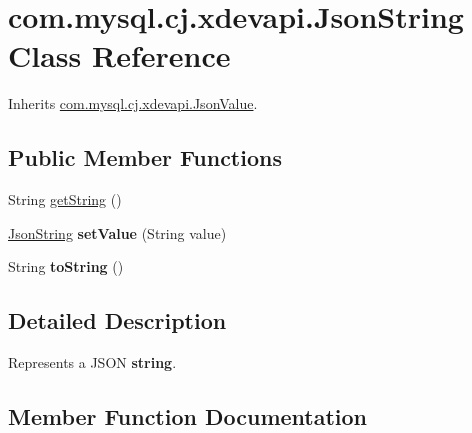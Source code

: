 \hypertarget{classcom_1_1mysql_1_1cj_1_1xdevapi_1_1_json_string}{}\section{com.\+mysql.\+cj.\+xdevapi.\+Json\+String Class Reference}
\label{classcom_1_1mysql_1_1cj_1_1xdevapi_1_1_json_string}


Inherits \mbox{\hyperlink{interfacecom_1_1mysql_1_1cj_1_1xdevapi_1_1_json_value}{com.\+mysql.\+cj.\+xdevapi.\+Json\+Value}}.

\subsection*{Public Member Functions}
\begin{DoxyCompactItemize}
\item 
String \mbox{\hyperlink{classcom_1_1mysql_1_1cj_1_1xdevapi_1_1_json_string_a39f1efefab35b1c29d67b653fd697851}{get\+String}} ()
\item 
\mbox{\label{classcom_1_1mysql_1_1cj_1_1xdevapi_1_1_json_string_a158d7795014b0fa7286f8094e5226458}} 
\mbox{\hyperlink{classcom_1_1mysql_1_1cj_1_1xdevapi_1_1_json_string}{Json\+String}} {\bfseries set\+Value} (String value)
\item 
\mbox{\label{classcom_1_1mysql_1_1cj_1_1xdevapi_1_1_json_string_a776cb9769c5d6d3c28ba12115b8898c9}} 
String {\bfseries to\+String} ()
\end{DoxyCompactItemize}


\subsection{Detailed Description}
Represents a J\+S\+ON {\bfseries string}. 

\subsection{Member Function Documentation}
\mbox{\label{classcom_1_1mysql_1_1cj_1_1xdevapi_1_1_json_string_a39f1efefab35b1c29d67b653fd697851}} 
